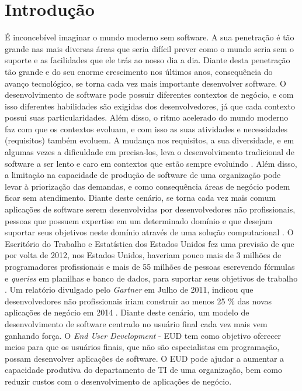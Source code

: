 \chapter[Introdução]{Introdução}

É inconcebível imaginar o mundo moderno sem software. A sua penetração é tão grande nas mais diversas áreas que seria difícil prever como o mundo seria sem o suporte e as facilidades que ele trás ao nosso dia a dia. Diante desta penetração tão grande e do seu enorme crescimento nos últimos anos, consequência do avanço tecnológico, se torna cada vez mais importante desenvolver software. O desenvolvimento de software pode possuir diferentes contextos de negócio, e com isso diferentes habilidades são exigidas dos desenvolvedores, já que cada contexto possui suas particularidades. Além disso, o ritmo acelerado do mundo moderno faz com que os contextos evoluam, e com isso as suas atividades e necessidades (requisitos) também evoluem. A mudança nos requisitos, a sua diversidade, e em algumas vezes a dificuldade em precisa-los, leva o desenvolvimento tradicional de software a ser lento e caro em contextos que estão sempre evoluindo \cite{lieberman2006}. Além disso, a limitação na capacidade de produção de software de uma organização pode levar à priorização das demandas, e como consequência áreas de negócio podem ficar sem atendimento. Diante deste cenário, se torna cada vez mais comum aplicações de software serem desenvolvidas por desenvolvedores não profissionais, pessoas que possuem expertise em um determinado domínio e que desejam suportar seus objetivos neste domínio através de uma solução computacional \cite{lieberman2006}. O Escritório do Trabalho e Estatística dos Estados Unidos fez uma previsão de que por volta de 2012, nos Estados Unidos, haveriam pouco mais de 3 milhões de programadores profissionais e mais de 55 milhões de pessoas escrevendo fórmulas e \textit{queries} em planilhas e banco de dados, para suportar seus objetivos de trabalho \cite{scaffidi2005}. Um relatório divulgado pelo \textit{Gartner} em Julho de 2011, indicou que desenvolvedores não profissionais iriam construir ao menos 25 \% das novas aplicações de negócio em 2014 \cite{paterno2013}. Diante deste cenário, um modelo de desenvolvimento de software centrado no usuário final cada vez mais vem ganhando força. O \textit{End User Development} - EUD tem como objetivo oferecer meios para que os usuários finais, que não são especialistas em programação, possam desenvolver aplicações de software. O EUD pode ajudar a aumentar a capacidade produtiva do departamento de TI de uma organização, bem como reduzir custos com o desenvolvimento de aplicações de negócio.

